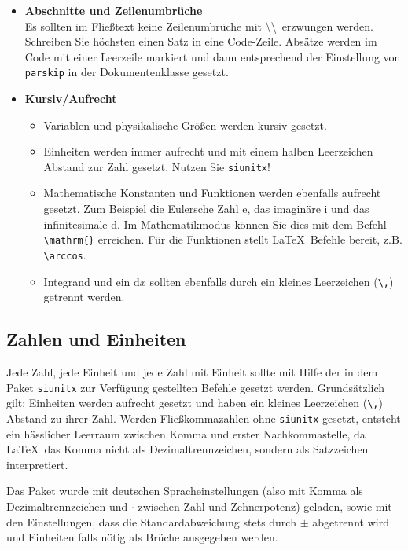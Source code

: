 \begin{itemize}
    \item \textbf{Abschnitte und Zeilenumbrüche} \\
        Es sollten im Fließtext keine Zeilenumbrüche mit \textbackslash\textbackslash \ erzwungen werden.
        Schreiben Sie höchsten einen Satz in eine Code-Zeile.
        Absätze werden im Code mit einer Leerzeile markiert und dann entsprechend der Einstellung von \texttt{parskip} in der Dokumentenklasse gesetzt.
    \item \textbf{Kursiv/Aufrecht} \\
        \begin{itemize}
            \item Variablen und physikalische Größen werden kursiv gesetzt. 
            \item Einheiten werden immer aufrecht und mit einem halben Leerzeichen Abstand zur Zahl gesetzt. Nutzen Sie \texttt{siunitx}!
            \item Mathematische Konstanten und Funktionen werden ebenfalls aufrecht gesetzt. Zum Beispiel die Eulersche Zahl e, das imaginäre i und das infinitesimale d.
                Im Mathematikmodus können Sie dies mit dem Befehl \verb_\mathrm{}_ erreichen. Für die Funktionen stellt \LaTeX \ Befehle bereit, z.B. \verb+\arccos+.
            \item Integrand und ein $\mathrm{d}x$ sollten ebenfalls durch ein kleines Leerzeichen (\verb+\,+) getrennt werden.
        \end{itemize}
        


\end{itemize}

\subsection{Zahlen und Einheiten}

Jede Zahl, jede Einheit und jede Zahl mit Einheit sollte mit Hilfe der in dem Paket \texttt{siunitx} zur Verfügung gestellten Befehle gesetzt werden.
Grundsätzlich gilt: Einheiten werden aufrecht gesetzt und haben ein kleines Leerzeichen (\verb+\,+) Abstand zu ihrer Zahl. 
Werden Fließkommazahlen ohne \texttt{siunitx} gesetzt, entsteht ein hässlicher Leerraum zwischen Komma und erster Nachkommastelle, da \LaTeX \ das Komma nicht als Dezimaltrennzeichen, sondern als Satzzeichen interpretiert.

Das Paket wurde mit deutschen Spracheinstellungen (also mit Komma als Dezimaltrennzeichen und $\cdot$ zwischen Zahl und Zehnerpotenz) geladen, sowie mit den Einstellungen, dass die Standardabweichung stets durch $\pm$ abgetrennt wird und Einheiten falls nötig als Brüche ausgegeben werden.

